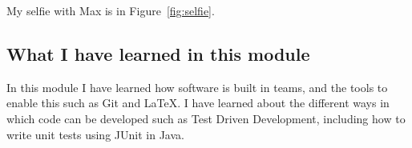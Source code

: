 My selfie with Max is in  Figure~\ref{fig:selfie}.

\subsection{What I have learned in this module}
In this module I have learned how software is built in teams, and the tools to enable this such as Git and LaTeX. I have learned about the different ways in which code can be developed such as Test Driven Development, including how to write unit tests using JUnit in Java.


